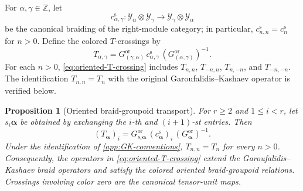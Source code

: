 \documentclass[11pt,a4paper]{article}
\newcommand{\ot}{\otimes}
\newtheorem{proposition}[theorem]{Proposition}
\theoremstyle{definition}
\theoremstyle{remark}
\begin{document}
For \(\alpha,\gamma\in\mathbb Z\), let
\[
 c_{\alpha,\gamma}^{\mathrm s}:
 \mathcal Y_\alpha\ot \mathcal Y_\gamma\longrightarrow \mathcal Y_\gamma\ot \mathcal Y_\alpha
\]
be the canonical braiding of the right-module category; in particular,
\(c_{n,n}^{\mathrm s}=c_n^{\mathrm s}\) for \(n>0\).
Define the colored \(T\)-crossings by
\begin{equation}\label{eq:oriented-T-crossing}
 T_{\alpha,\gamma}
 =
 G_{(\gamma,\alpha)}^{\mathrm{or}}\,
 c_{\alpha,\gamma}^{\mathrm s}\,
 (G_{(\alpha,\gamma)}^{\mathrm{or}})^{-1}.
\end{equation}
For each \(n>0\), \eqref{eq:oriented-T-crossing} includes
\(T_{n,n}\), \(T_{-n,n}\),
\(T_{n,-n}\), and \(T_{-n,-n}\).
The identification \(T_{n,n}=T_n\) with the original
Garoufalidis--Kashaev operator is verified below.

\begin{proposition}[Oriented braid-groupoid transport]
\label{prop:oriented-transport}
For \(r\geq2\) and \(1\leq i<r\), let
\(s_i\boldsymbol\alpha\) be obtained by exchanging the \(i\)-th and
\((i+1)\)-st entries.  Then
\begin{equation}\label{eq:oriented-local-transport}
 (T_{\boldsymbol\alpha})_i
 =
 G_{s_i\boldsymbol\alpha}^{\mathrm{or}}\,
 (c_{\boldsymbol\alpha}^{\mathrm s})_i\,
 (G_{\boldsymbol\alpha}^{\mathrm{or}})^{-1}.
\end{equation}
Under the identification of \cref{app:GK-conventions},
\(T_{n,n}=T_n\) for every \(n>0\).  Consequently, the operators in
\eqref{eq:oriented-T-crossing} extend the Garoufalidis--Kashaev braid
operators and satisfy the colored oriented braid-groupoid relations.
Crossings involving color zero are the canonical tensor-unit maps.
\end{proposition}
\end{document}

